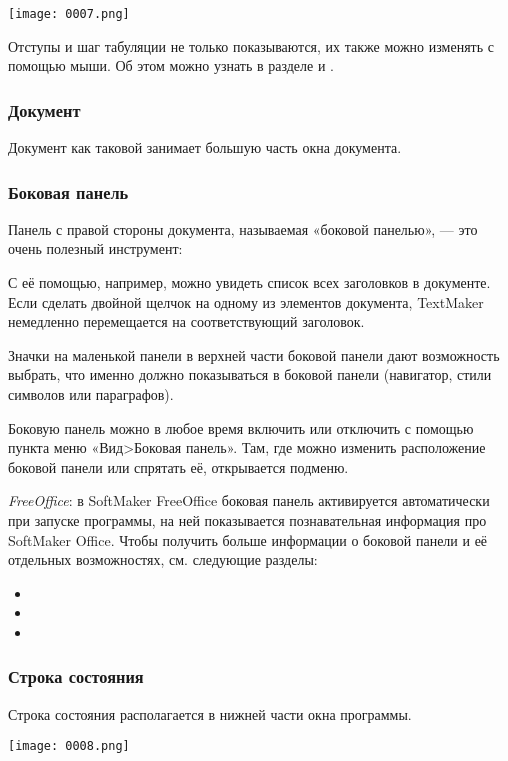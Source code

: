 ﻿\documentclass[a4paper,10pt]{article}
\begin{document}
\texttt{[image: 0007.png]}

Отступы и шаг табуляции не только показываются, их также можно изменять с помощью мыши. Об этом можно узнать в разделе  и .

\subsubsection{Документ}
Документ как таковой занимает большую часть окна документа.

\subsubsection{Боковая панель}
Панель с правой стороны документа, называемая «боковой панелью», — это очень полезный инструмент:

С её помощью, например, можно увидеть список всех заголовков в документе. Если сделать двойной щелчок на одному из элементов документа, TextMaker немедленно перемещается на соответствующий заголовок.

Значки на маленькой панели в верхней части боковой панели дают возможность выбрать, что именно должно показываться в боковой панели (навигатор, стили символов или параграфов).

Боковую панель можно в любое время включить или отключить с помощью пункта меню «Вид>Боковая панель». Там, где можно изменить расположение боковой панели или спрятать её, открывается подменю.

\textit{FreeOffice}: в SoftMaker FreeOffice боковая панель активируется автоматически при запуске программы, на ней показывается познавательная информация про SoftMaker Office.
Чтобы получить больше информации о боковой панели и её отдельных возможностях, см. следующие разделы:
\begin{itemize}
 \item {}
 \item {}
 \item {}
\end{itemize}

\subsubsection{Строка состояния}
Строка состояния располагается в нижней части окна программы.

\texttt{[image: 0008.png]}
\end{document}
